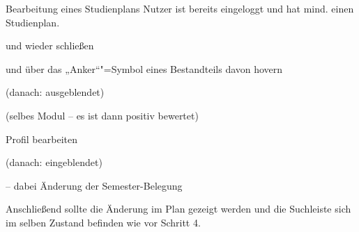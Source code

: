 \begin{scenario*}{Bearbeitung eines Studienplans}
	{Nutzer ist bereits eingeloggt und hat mind. einen Studienplan.}
	\item {}
	\item {} 
	\item {} und wieder schließen
	\item {}
	\item {}
	\item {} 
	\item {} und über das „Anker“"=Symbol eines Bestandteils davon hovern
	\item {} (danach: ausgeblendet)
	\item {}
	\item {}
	\item {}
	\item {} (selbes Modul – es ist dann positiv bewertet) 
	\item {}
	\item {}
	\item {}
\end{scenario*}

\begin{scenario}{Profil bearbeiten}
	\item {}
	\item {} (danach: eingeblendet)
	\item {}
	\item {} – dabei Änderung der Semester-Belegung
	\item Anschließend sollte die Änderung im Plan gezeigt werden und die Suchleiste sich im selben Zustand befinden wie vor Schritt 4.
\end{scenario}

